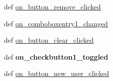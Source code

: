 \begin{DoxyCompactItemize}
\item 
def \hyperlink{classadd__edit_1_1add__edit_ab6f6f5576d0bc5f58ae5a8a091ad3498}{on\_\-button\_\-remove\_\-clicked}
\item 
def \hyperlink{classadd__edit_1_1add__edit_ab608c188bfe5303021ca3be1e5ff5980}{on\_\-comboboxentry1\_\-changed}
\item 
def \hyperlink{classadd__edit_1_1add__edit_adc575587401bca679818d55e6d9a9d77}{on\_\-button\_\-clear\_\-clicked}
\item 
\hypertarget{classadd__edit_1_1add__edit_a2b003110ac8cdc8149e36bd281045567}{
def {\bfseries on\_\-checkbutton1\_\-toggled}}
\label{classadd__edit_1_1add__edit_a2b003110ac8cdc8149e36bd281045567}

\item 
def \hyperlink{classadd__edit_1_1add__edit_aad6b0c644235b89c700646ac08223dec}{on\_\-button\_\-new\_\-user\_\-clicked}
\end{DoxyCompactItemize}
